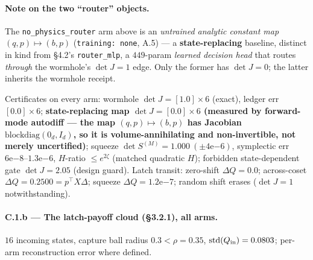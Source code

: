 \documentclass[11pt]{article}
\newcommand{\detJ}{\det J}
\begin{document}
\paragraph{Note on the two ``router'' objects.} The \texttt{no\_physics\_router} arm above is an \emph{untrained analytic constant map} $(q,p)\mapsto(b,p)$ (\texttt{training: none}, A.5) --- a \textbf{state-replacing} baseline, distinct in kind from \S4.2's \texttt{router\_mlp}, a $449$-param \emph{learned decision head} that routes \emph{through} the wormhole's $\detJ=1$ edge. Only the former has $\detJ=0$; the latter inherits the wormhole receipt.

\noindent Certificates on every arm: wormhole $\detJ=[1.0]\times6$ (exact), ledger err $[0.0]\times6$; \textbf{state-replacing map $\detJ=[0.0]\times6$ (measured by forward-mode autodiff --- the map $(q,p)\mapsto(b,p)$ has Jacobian $\mathrm{blockdiag}(0_d,I_d)$, so it is volume-annihilating and non-invertible, not merely uncertified)}; squeeze $\det S^{(M)}=1.000\ (\pm4\mathrm{e}{-6})$, symplectic err $6\mathrm{e}{-8}$--$1.3\mathrm{e}{-6}$, $H$-ratio $\le e^{2\zeta}$ (matched quadratic $H$); forbidden state-dependent gate $\detJ=2.05$ (design guard). Latch transit: zero-shift $\Delta Q=0.0$; across-coset $\Delta Q=0.2500=p^\top X\Delta$; squeeze $\Delta Q=1.2\mathrm{e}{-7}$; random shift erases ($\detJ=1$ notwithstanding).

\paragraph{C.1.b --- The latch-payoff cloud (\S3.2.1), all arms.} $16$ incoming states, capture ball radius $0.3<\rho=0.35$, $\mathrm{std}(Q_{\rm in})=0.0803$; per-arm reconstruction error where defined.

\end{document}
